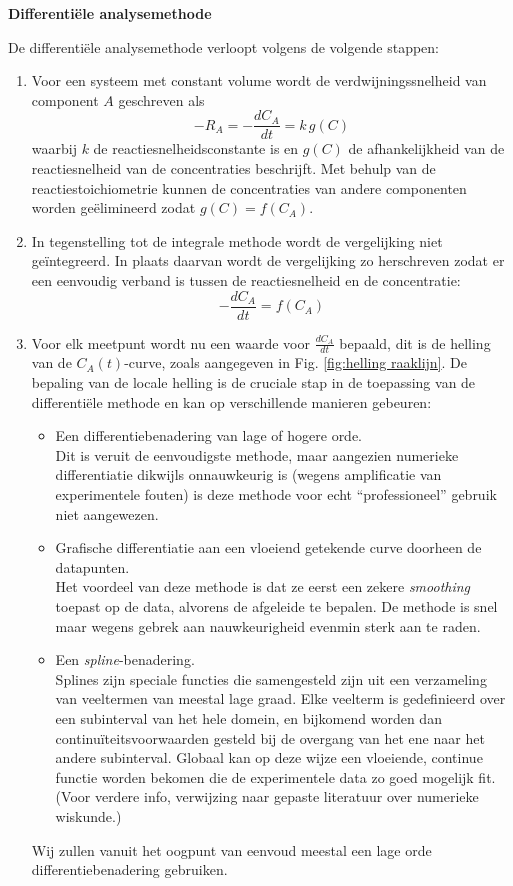 \documentclass{ximera}
\begin{document}
\begin{procedure} \textbf{Differentiële analysemethode}

De differentiële analysemethode verloopt volgens de volgende stappen:

\begin{enumerate}
\item Voor een systeem met constant volume wordt de verdwijningssnelheid van component $A$ geschreven als
\[
-R_A = - \frac{dC_A}{dt} = k\,g(C)
\]
waarbij $k$ de reactiesnelheidsconstante is en $g(C)$ de afhankelijkheid van de reactiesnelheid van de concentraties beschrijft. Met behulp van de reactiestoichiometrie kunnen de concentraties van andere componenten worden geëlimineerd zodat $g(C) = f(C_A)$.

\item In tegenstelling tot de integrale methode wordt de vergelijking niet geïntegreerd. In plaats daarvan wordt de vergelijking zo herschreven zodat er een eenvoudig verband is tussen de reactiesnelheid en de concentratie:
\[
- \frac{dC_A}{dt} = f(C_A)
\]

\item Voor elk meetpunt wordt nu een waarde voor $\frac{dC_A}{dt}$ bepaald, dit is de helling van de $C_A(t)$-curve, zoals aangegeven in Fig. \ref{fig:helling raaklijn}. 
De bepaling van de locale helling is de cruciale stap in de toepassing van de differentiële methode en kan op verschillende manieren gebeuren:
\begin{itemize}
    \item Een differentiebenadering van lage of hogere orde. \\
    Dit is veruit de eenvoudigste methode, maar aangezien numerieke differentiatie dikwijls onnauwkeurig is (wegens amplificatie van experimentele fouten) is deze methode voor echt ``professioneel'' gebruik niet aangewezen.
    \item Grafische differentiatie aan een vloeiend getekende curve doorheen de datapunten. \\
    Het voordeel van deze methode is dat ze eerst een zekere \textit{smoothing} toepast op de data, alvorens de afgeleide te bepalen. De methode is snel maar wegens gebrek aan nauwkeurigheid evenmin sterk aan te raden.
    \item Een \textit{spline}-benadering. \\
    Splines zijn speciale functies die samengesteld zijn uit een verzameling van veeltermen van meestal lage graad. Elke veelterm is gedefinieerd over een subinterval van het hele domein, en bijkomend worden dan continu\"iteitsvoorwaarden gesteld bij de overgang van het ene naar het andere subinterval. Globaal kan op deze wijze een vloeiende, continue functie worden bekomen die de experimentele data zo goed mogelijk fit. (Voor verdere info, verwijzing naar gepaste literatuur over numerieke wiskunde.)
\end{itemize}
Wij zullen vanuit het oogpunt van eenvoud meestal een lage orde differentiebenadering gebruiken. \\


\end{enumerate}
\end{procedure}
\end{document}
